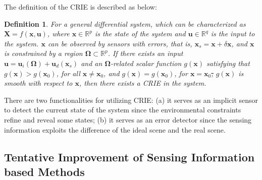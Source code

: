 \documentclass[journal,twoside,web]{ieeecolor}
\newtheorem{definition}{\bf Definition}
\providecommand{\DIFadd}[1]{{\protect\color{blue}\uwave{#1}}} %
\providecommand{\DIFdel}[1]{{\protect\color{red}\sout{#1}}}                      %
\providecommand{\DIFaddbegin}{} %
\providecommand{\DIFaddend}{} %
\providecommand{\DIFdelbegin}{} %
\providecommand{\DIFdelend}{} %
\newcommand{\DIFscaledelfig}{0.5}
\newlength{\DIFdelgraphicswidth} %
\newlength{\DIFdelgraphicsheight} %
\newcommand{\DIFaddincludegraphics}[2][]{{\color{blue}\fbox{\DIFOincludegraphics[#1]{#2}}}} %
\newcommand{\DIFdelincludegraphics}[2][]{%
\sbox{\DIFdelgraphicsbox}{\DIFOincludegraphics[#1]{#2}}%
\settoboxwidth{\DIFdelgraphicswidth}{\DIFdelgraphicsbox} %
\settoboxtotalheight{\DIFdelgraphicsheight}{\DIFdelgraphicsbox} %
\scalebox{\DIFscaledelfig}{%
\parbox[b]{\DIFdelgraphicswidth}{\usebox{\DIFdelgraphicsbox}\\[-\baselineskip] \rule{\DIFdelgraphicswidth}{0em}}\llap{\resizebox{\DIFdelgraphicswidth}{\DIFdelgraphicsheight}{%
\setlength{\unitlength}{\DIFdelgraphicswidth}%
\begin{picture}(1,1)%
\thicklines\linethickness{2pt} %
{\color[rgb]{1,0,0}\put(0,0){\framebox(1,1){}}}%
{\color[rgb]{1,0,0}\put(0,0){\line( 1,1){1}}}%
{\color[rgb]{1,0,0}\put(0,1){\line(1,-1){1}}}%
\end{picture}%
}\hspace*{3pt}}} %
} %
\DeclareRobustCommand{\DIFaddbegin}{\DIFOaddbegin \let\includegraphics\DIFaddincludegraphics} %
\DeclareRobustCommand{\DIFaddend}{\DIFOaddend \let\includegraphics\DIFOincludegraphics} %
\DeclareRobustCommand{\DIFdelbegin}{\DIFOdelbegin \let\includegraphics\DIFdelincludegraphics} %
\DeclareRobustCommand{\DIFdelend}{\DIFOaddend \let\includegraphics\DIFOincludegraphics} %
\begin{document}
The definition of the CRIE is described as below:
\begin{definition}
    For a general differential system, which can be characterized as $ \mathbf{X}=f(\mathbf{x}, \mathbf{u}) $, where $ \mathbf{x} \in \mathbb{R}^{p} $ is the state of the system and $ \mathbf{u} \in \mathbb{R}^{q} $ is the input to the system. $ \mathbf{x} $ can be observed by sensors with errors, that is, $ \mathbf{x}_{s}=\mathbf{x}+\delta\mathbf{x} $, and $ \mathbf{x} $ is constrained by a region $ \mathbf{\Omega} \subset \mathbb{R}^{p}$. If there exists an input $ \mathbf{u}=\mathbf{u}_{i}(\mathbf{\Omega})+\mathbf{u}_{d}(\mathbf{x}_{s}) $ and an $ \mathbf{\Omega} $-related scalar function $ g(\mathbf{x}) $ satisfying that
    \DIFdelbegin %
\DIFdelend \DIFaddbegin \DIFadd{(a) }\DIFaddend $ g(\mathbf{x}) > g(\mathbf{x}_{0}) $, for all $ \mathbf{x} \ne \mathbf{x}_{0} $, and $ g(\mathbf{x}) = g(\mathbf{x}_{0}) $, for $ \mathbf{x} = \mathbf{x}_{0} $\DIFdelbegin \DIFdel{;
        }%
\DIFdelend \DIFaddbegin \DIFadd{, and
    (b) }\DIFaddend $ g(\mathbf{x}) $ is smooth with respect to $ \mathbf{x} $,
    \DIFdelbegin %
\DIFdelend then there exists a CRIE in the system.
\end{definition}

There are two functionalities for utilizing CRIE: 
(a) it serves as an implicit sensor to detect the current state of the system since the environmental constraints refine and reveal some states;
(b) it serves as an error detector since the sensing information exploits the difference of the ideal scene and the real scene.

\subsection{Tentative Improvement of Sensing Information based Methods}
\label{subsec:tentative}
\end{document}
